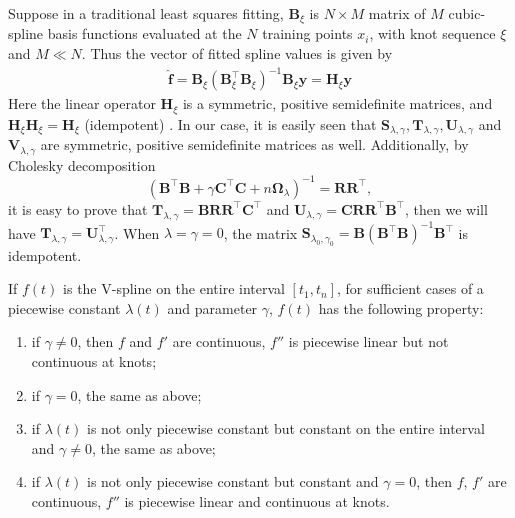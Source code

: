 Suppose in a traditional least squares fitting, $\mathbf{B}_\xi$ is $N \times M$ matrix of $M$ cubic-spline basis functions evaluated at the $N$ training points $x_i$, with knot sequence $\xi$ and $M \ll N$. Thus the vector of fitted spline values is given by
\begin{align}\label{fhy}
\hat{\mathbf{f}}=\mathbf{B}_\xi\left(\mathbf{B}^\top_\xi\mathbf{B}_\xi\right)^{-1}\mathbf{B}_\xi\mathbf{y}=\mathbf{H}_\xi\mathbf{y}
\end{align}
Here the linear operator $\mathbf{H}_\xi$ is a symmetric, positive semidefinite matrices, and $\mathbf{H}_\xi\mathbf{H}_\xi=\mathbf{H}_\xi$ (idempotent) \citep{esl2009}. In our case, it is easily seen that $\mathbf{S}_{\lambda,\gamma}, \mathbf{T}_{\lambda,\gamma}, \mathbf{U}_{\lambda,\gamma}$ and $\mathbf{V}_{\lambda,\gamma}$ are symmetric, positive semidefinite matrices as well. Additionally, by Cholesky decomposition
\begin{equation}
\left(\mathbf{B}^\top\mathbf{B}+\gamma\mathbf{C}^\top\mathbf{C}+n\mathbf{\Omega}_{\lambda}\right)^{-1}=\mathbf{R}\mathbf{R}^\top,
\end{equation}
it is easy to prove that $\mathbf{T}_{\lambda,\gamma}=\mathbf{B}\mathbf{R}\mathbf{R}^\top\mathbf{C}^\top$ and $\mathbf{U}_{\lambda,\gamma}=\mathbf{C}\mathbf{R}\mathbf{R}^\top\mathbf{B}^\top$, then we will have 
 $\mathbf{T}_{\lambda,\gamma}= \mathbf{U}_{\lambda,\gamma}^\top$. When $\lambda=\gamma=0$, the matrix $\mathbf{S}_{\lambda_0,\gamma_0}=\mathbf{B}\left(\mathbf{B}^\top\mathbf{B}\right)^{-1}\mathbf{B}^\top$ is idempotent.  


\begin{corollary}\label{TractorsplineCorollary}
If $f(t)$ is the V-spline on the entire interval $[t_1,t_n]$, for sufficient cases of a piecewise constant $\lambda(t)$ and parameter $\gamma$, $f(t)$ has the following property:
\begin{enumerate}\itemsep0em 
\item if $\gamma \neq 0$, then $f$ and $f'$ are continuous, $f''$ is piecewise linear but not continuous at knots;
\item if $\gamma = 0$, the same as above;
\item if $\lambda(t)$ is not only piecewise constant but constant on the entire interval and $\gamma \neq 0$, the same as above;
\item if $\lambda(t)$ is not only piecewise constant but constant and $\gamma = 0$, then $f$, $f'$ are continuous, $f''$ is piecewise linear and continuous at knots.
\end{enumerate}
\end{corollary}

